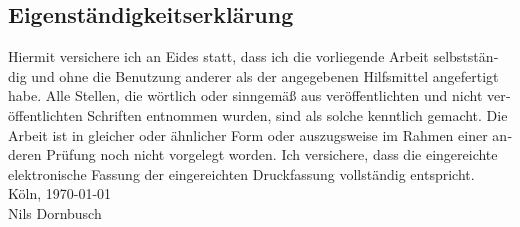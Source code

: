 \documentclass[12pt,a4paper,twoside, open=right]{scrreprt}
\theoremstyle{definition}
\theoremstyle{plain}
\begin{document}
\setcounter{lofdepth}{2}
\listoffigures
\newpage
{}

{}
\newpage
\begin{otherlanguage}{ngerman}
\chapter*{Eigenständigkeitserklärung}
Hiermit versichere ich an Eides statt, dass ich die vorliegende Arbeit selbstständig und ohne die Benutzung anderer als der angegebenen  Hilfsmittel  angefertigt  habe.  
Alle  Stellen,  die  wörtlich  oder  sinngemäß  aus  veröffentlichten  und  nicht  veröffentlichten  Schriften  entnommen  wurden,  sind  als  solche  kenntlich  gemacht.  
Die  Arbeit  ist  in  gleicher  oder  ähnlicher  Form  oder  auszugsweise  im  Rahmen  einer  anderen  Prüfung  noch  nicht  vorgelegt  worden. 
Ich  versichere,  dass  die  eingereichte    elektronische    Fassung    der    eingereichten    Druckfassung    vollständig    entspricht.
\\[\bigskipamount]
Köln, \today
\\[2\bigskipamount]
Nils Dornbusch
\end{otherlanguage}
\end{document}
